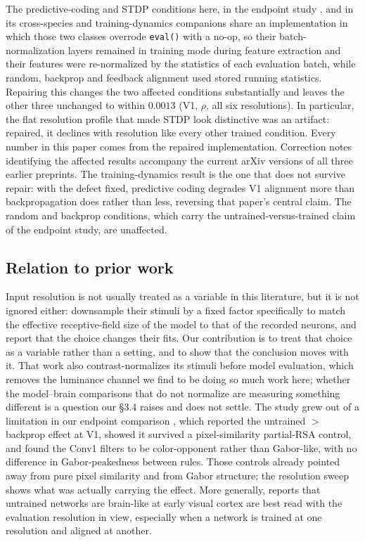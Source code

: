 \documentclass[10pt,twocolumn]{article}
\begin{document}
The predictive-coding and STDP conditions here, in the endpoint study \citep{leutenegger2026}, and in its cross-species and training-dynamics companions share an implementation in which those two classes overrode \texttt{eval()} with a no-op, so their batch-normalization layers remained in training mode during feature extraction and their features were re-normalized by the statistics of each evaluation batch, while random, backprop and feedback alignment used stored running statistics. Repairing this changes the two affected conditions substantially and leaves the other three unchanged to within $0.0013$ (V1, $\rho$, all six resolutions). In particular, the flat resolution profile that made STDP look distinctive was an artifact: repaired, it declines with resolution like every other trained condition. Every number in this paper comes from the repaired implementation. Correction notes identifying the affected results accompany the current arXiv versions of all three earlier preprints. The training-dynamics result is the one that does not survive repair: with the defect fixed, predictive coding degrades V1 alignment more than backpropagation does rather than less, reversing that paper's central claim. The random and backprop conditions, which carry the untrained-versus-trained claim of the endpoint study, are unaffected.

\subsection{Relation to prior work}

Input resolution is not usually treated as a variable in this literature, but it is not ignored either: \citet{laskar2018} downsample their stimuli by a fixed factor specifically to match the effective receptive-field size of the model to that of the recorded neurons, and report that the choice changes their fits. Our contribution is to treat that choice as a variable rather than a setting, and to show that the conclusion moves with it. That work also contrast-normalizes its stimuli before model evaluation, which removes the luminance channel we find to be doing so much work here; whether the model--brain comparisons that do not normalize are measuring something different is a question our \S3.4 raises and does not settle. The study grew out of a limitation in our endpoint comparison \citep{leutenegger2026}, which reported the untrained $>$ backprop effect at V1, showed it survived a pixel-similarity partial-RSA control, and found the Conv1 filters to be color-opponent rather than Gabor-like, with no difference in Gabor-peakedness between rules. Those controls already pointed away from pure pixel similarity and from Gabor structure; the resolution sweep shows what was actually carrying the effect. More generally, reports that untrained networks are brain-like at early visual cortex \citep{saxe2011,truzzi2025} are best read with the evaluation resolution in view, especially when a network is trained at one resolution and aligned at another.
\end{document}

